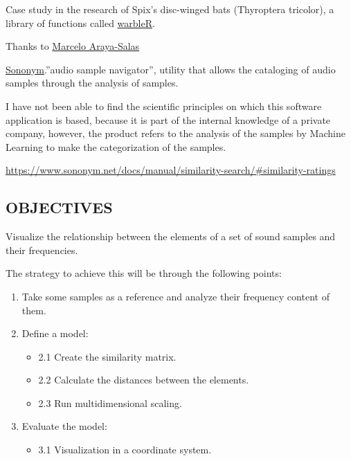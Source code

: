 \documentclass[
]{article}
\providecommand{\tightlist}{%
  \setlength{\itemsep}{0pt}\setlength{\parskip}{0pt}}
\begin{document}
\vspace{15pt}

Case study in the research of Spix's disc-winged bats (Thyroptera
tricolor), a library of functions called
\href{https://github.com/maRce10/warbleR}{warbleR}.

Thanks to \href{https://github.com/maRce10}{Marcelo Araya-Salas}

\vspace{15pt}

\href{https://www.sononym.net/}{Sononym}.''audio sample navigator'',
utility that allows the cataloging of audio samples through the analysis
of samples.

I have not been able to find the scientific principles on which this
software application is based, because it is part of the internal
knowledge of a private company, however, the product refers to the
analysis of the samples by Machine Learning to make the categorization
of the samples.

\url{https://www.sononym.net/docs/manual/similarity-search/\#similarity-ratings}

\vspace{45pt}

\newpage

\hypertarget{objectives}{%
\subsection{OBJECTIVES}\label{objectives}}

\vspace{30pt}

Visualize the relationship between the elements of a set of sound
samples and their frequencies. \vspace{12pt}

The strategy to achieve this will be through the following points:
\vspace{12pt}

\begin{enumerate}
\def\labelenumi{\arabic{enumi}.}
\item
  Take some samples as a reference and analyze their frequency content
  of them.
\item
  Define a model:

  \begin{itemize}
  \item
    2.1 Create the similarity matrix.
  \item
    2.2 Calculate the distances between the elements.
  \item
    2.3 Run multidimensional scaling.
  \end{itemize}
\item
  Evaluate the model:

  \begin{itemize}
  \tightlist
  \item
    3.1 Visualization in a coordinate system.
  \end{itemize}
\end{enumerate}
\end{document}

